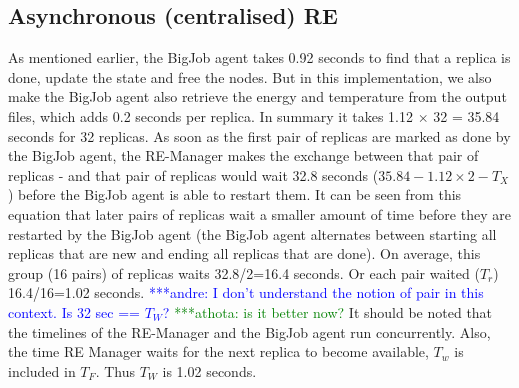 \documentclass{rspublic}
\newcommand{\alnote}[1]{ {\textcolor{blue} { ***andre: #1 }}}
\newcommand{\athotanote}[1]{ {\textcolor{green} { ***athota: #1 }}}
\newcommand{\alnote}[1]{}
\newcommand{\athotanote}[1]{}
\begin{document}
\subsection{Asynchronous (centralised) RE}



As mentioned earlier, the BigJob agent takes 0.92 seconds to find that
a replica is done, update the state and free the nodes. But in this
implementation, we also make the BigJob agent also retrieve the energy
and temperature from the output files, which adds 0.2 seconds per
replica. In summary it takes 1.12 $\times$ 32 = 35.84 seconds for 32
replicas. As soon as the first pair of replicas are marked as done by the
BigJob agent, the RE-Manager makes the exchange between
that pair of replicas - and that pair of replicas would wait 32.8 seconds ($35.84-1.12\times2-T_X$) before the BigJob agent is able to restart
them. It can be seen from this equation that later pairs of replicas wait a smaller amount of time before they are restarted by the BigJob agent (the BigJob agent alternates between starting all replicas that are new and ending all replicas that are done). On average, this group (16 pairs) of replicas waits  32.8/2=16.4 seconds. Or each pair waited ($T_r$) 16.4/16=1.02 seconds.  \alnote{I don't understand the notion of pair in this context. Is 32 sec == $T_W$?}\athotanote{is it better now?} It should be noted that the timelines
of the RE-Manager and the BigJob agent run concurrently. Also, the time RE Manager waits for the next replica to become available, $T_w$ is included in $T_F$. Thus $T_W$ is 1.02 seconds.
\end{document}
